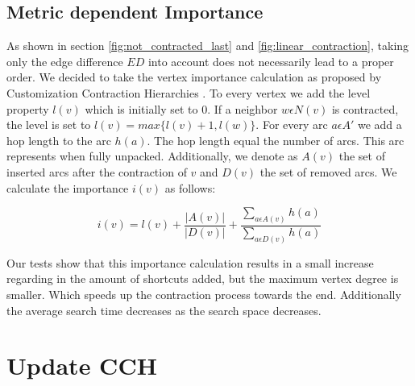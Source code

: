 \subsection{Metric dependent Importance}\label{sec:metric_dependent_importance}

As shown in section \ref{fig:not_contracted_last} and \ref{fig:linear_contraction}, taking only the edge difference $ED$ into account does not  necessarily lead to a proper order.
We decided to take the vertex importance calculation as proposed by Customization Contraction Hierarchies \cite{CCH}.
To every vertex we add the level property $l(v)$ which is initially set to $0$.
If a neighbor $w \epsilon N(v)$ is contracted, the level is set to $l(v) = max\{l(v)+1, l(w)\}$.
For every arc $a \epsilon A'$ we add a hop length to the arc $h(a)$.
The hop length equal the number of arcs.
This arc represents when fully unpacked.
Additionally, we denote as $A(v)$ the set of inserted arcs after the contraction of $v$ and $D(v)$ the set of removed arcs.
We calculate the importance $i(v)$ as follows:

\begin{equation}
    \label{eq:importance}
    i(v) = l(v) + \frac{|A(v)|}{|D(v)|} + \frac{\sum_{a \epsilon A(v)} h(a)}{\sum_{a \epsilon D(v)} h(a)} 
\end{equation}

Our tests show that this importance calculation results in a small increase regarding in the amount of shortcuts added, but the maximum vertex degree is smaller.
Which speeds up the contraction process towards the end.
Additionally the average search time decreases as the search space decreases.


% 

\section{Update CCH}



